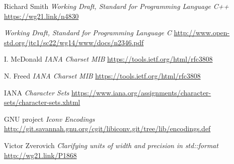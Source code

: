 \documentclass{wg21}
\begin{document}
 
\begin{thebibliography}{9}
    
    Richard Smith
    \emph{Working Draft, Standard for Programming Language C++}\newline
    \url{https://wg21.link/n4830}
    
    
    \emph{Working Draft, Standard for Programming Language C}\newline
    \url{ http://www.open-std.org/jtc1/sc22/wg14/www/docs/n2346.pdf}
    
    
   
    
    I. McDonald
    \emph{IANA Charset MIB}\newline
    \url{https://tools.ietf.org/html/rfc3808}
    
    N. Freed
    \emph{IANA Charset MIB}\newline
    \url{https://tools.ietf.org/html/rfc3808}
    
    IANA
    \emph{Character Sets}\newline
    \url{https://www.iana.org/assignments/character-sets/character-sets.xhtml}
    
    
    GNU project
    \emph{Iconv Encodings}\newline
    \url{http://git.savannah.gnu.org/cgit/libiconv.git/tree/lib/encodings.def}
    
    Victor Zverovich
    \emph{Clarifying units of width and precision in std::format}\newline
    \url{http://wg21.link/P1868}
    

    
\end{thebibliography}
\end{document}
